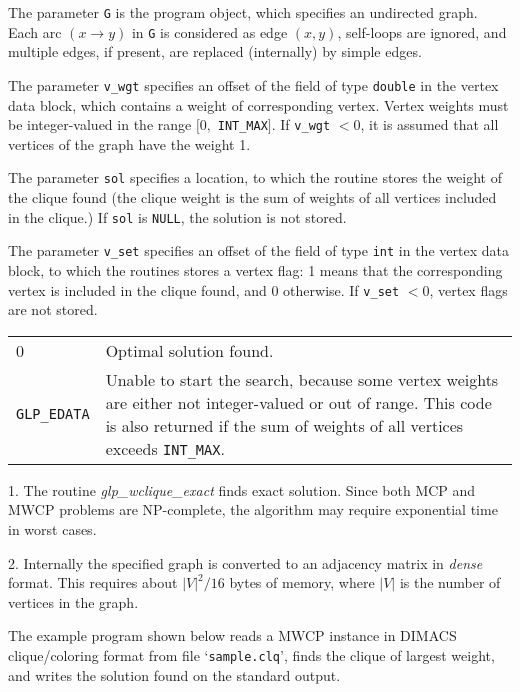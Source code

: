 \documentclass[11pt]{report}
\makeatletter
\def\para#1{\noindent{\bf#1}}
\def\returns{\para{Returns}}
\newenvironment{retlist}
{  \def\arraystretch{1.5}
   \noindent
   \begin{tabular}{@{}p{1in}@{}p{5.5in}@{}}
}
{\end{tabular}}
\makeatother
\begin{document}
The parameter {\tt G} is the program object, which specifies
an undirected graph. Each arc $(x\rightarrow y)$ in {\tt G} is
considered as edge $(x,y)$, self-loops are ignored, and multiple edges,
if present, are replaced (internally) by simple edges.

The parameter {\tt v\_wgt} specifies an offset of the field of type
{\tt double} in the vertex data block, which contains a weight of
corresponding vertex. Vertex weights must be integer-valued in the
range $[0,$ {\tt INT\_MAX}$]$. If {\tt v\_wgt} $<0$, it is assumed that
all vertices of the graph have the weight 1.

\newpage

The parameter {\tt sol} specifies a location, to which the routine
stores the weight of the clique found (the clique weight is the sum
of weights of all vertices included in the clique.) If {\tt sol} is
{\tt NULL}, the solution is not stored.

The parameter {\tt v\_set} specifies an offset of the field of type
{\tt int} in the vertex data block, to which the routines stores a
vertex flag: 1 means that the corresponding vertex is included in the
clique found, and 0 otherwise. If {\tt v\_set} $<0$, vertex flags are
not stored.

\returns

\begin{retlist}
0 & Optimal solution found.\\

\verb|GLP_EDATA| & Unable to start the search, because some vertex
weights are either not integer-valued or out of range. This code is
also returned if the sum of weights of all vertices exceeds
{\tt INT\_MAX}. \\
\end{retlist}

\para{Notes}

1. The routine {\it glp\_wclique\_exact} finds exact solution. Since
both MCP and MWCP problems are NP-complete, the algorithm may require
exponential time in worst cases.

2. Internally the specified graph is converted to an adjacency matrix
in {\it dense} format. This requires about $|V|^2/16$ bytes of memory,
where $|V|$ is the number of vertices in the graph.

\para{Example}

The example program shown below reads a MWCP instance in DIMACS
clique/coloring format from file `\verb|sample.clq|', finds the clique
of largest weight, and writes the solution found on the standard
output.
\end{document}
